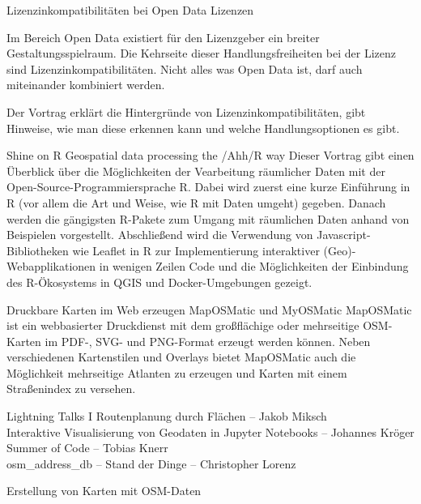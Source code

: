 %
{Lizenzinkompatibilitäten bei Open Data Lizenzen}%
{}%
{Im Bereich Open Data existiert für den Lizenzgeber ein breiter Gestaltungsspielraum. Die Kehrseite
  dieser Handlungsfreiheiten bei der Lizenz sind Lizenzinkompatibilitäten. Nicht alles was Open Data
  ist, darf auch miteinander kombiniert werden.

Der Vortrag erklärt die Hintergründe von Lizenzinkompatibilitäten, gibt Hinweise, wie man diese
erkennen kann und welche Handlungsoptionen es gibt.}

%
{Shine on R}%
{Geospatial data processing the /Ahh/R way}%
{Dieser Vortrag gibt einen Überblick über die Möglichkeiten der Vearbeitung räumlicher Daten mit der
  Open-Source-Programmiersprache R. Dabei wird zuerst eine kurze Einführung in R (vor allem die Art
  und Weise, wie R mit Daten umgeht) gegeben. Danach werden die gängigsten R-Pakete zum Umgang mit
  räumlichen Daten anhand von Beispielen vorgestellt. Abschließend wird die Verwendung von
  Javascript-Bibliotheken wie Leaflet in R zur Implementierung interaktiver (Geo)-Webapplikationen
  in wenigen Zeilen Code und die Möglichkeiten der Einbindung des R-Ökosystems in QGIS und
  Docker-Umgebungen gezeigt.}

%
{Druckbare Karten im Web erzeugen}%
{MapOSMatic und MyOSMatic}%
{%
  MapOSMatic ist ein webbasierter Druckdienst mit dem großflächige oder mehrseitige OSM-Karten im
  PDF-, SVG- und PNG-Format erzeugt werden können. Neben verschiedenen Kartenstilen und Overlays
  bietet MapOSMatic auch die Möglichkeit mehrseitige Atlanten zu erzeugen und Karten mit einem
  Straßenindex zu versehen.
}

\abstractNeun{}%
{Lightning Talks I}%
{}%
{Routenplanung durch Flächen -- Jakob Miksch\\
Interaktive Visualisierung von Geodaten in Jupyter Notebooks -- Johannes Kröger\\
Summer of Code -- Tobias Knerr\\
osm\_address\_db -- Stand der Dinge -- Christopher Lorenz}

%
{Erstellung von Karten mit OSM-Daten}%
{}%
{}


\newpage
{}
